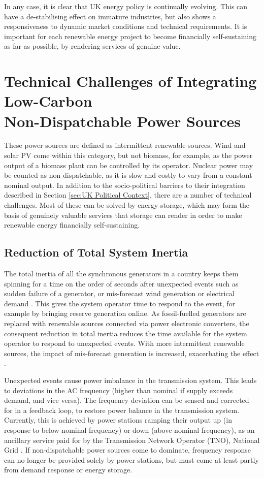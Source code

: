 \documentclass[report_18month.tex]{subfiles}
\begin{document}
In any case, it is clear that UK energy policy is continually evolving. This can have a de-stabilising effect on immature industries, but also shows a responsiveness to dynamic market conditions and technical requirements. It is important for each renewable energy project to become financially self-sustaining as far as possible, by rendering services of genuine value.

\section{Technical Challenges of Integrating Low-Carbon\\ Non-Dispatchable Power Sources}
\label{sec:Technical Challenges of Integrating Low-Carbon Non-Dispatchable Power Sources}
These power sources are defined as intermittent renewable sources. Wind and solar PV come within this category, but not biomass, for example, as the power output of a biomass plant can be controlled by its operator. Nuclear power may be counted as non-dispatchable, as it is slow and costly to vary from a constant nominal output. In addition to the socio-political barriers to their integration described in Section \ref{sec:UK Political Context}, there are a number of technical challenges. Most of these can be solved by energy storage, which may form the basis of genuinely valuable services that storage can render in order to make renewable energy financially self-sustaining.

\subsection{Reduction of Total System Inertia}
\label{sec:Reduction of Total System Inertia}
The total inertia of all the synchronous generators in a country keeps them spinning for a time on the order of seconds after unexpected events such as sudden failure of a generator, or mis-forecast wind generation or electrical demand \cite{kirby2004frequency}. This gives the system operator time to respond to the event, for example by bringing reserve generation online. As fossil-fuelled generators are replaced with renewable sources connected via power electronic converters, the consequent reduction in total inertia reduces the time available for the system operator to respond to unexpected events. With more intermittent renewable sources, the impact of mis-forecast generation is increased, exacerbating the effect \cite{klimstra2014power}.

Unexpected events cause power imbalance in the transmission system. This leads to deviations in the AC frequency (higher than nominal if supply exceeds demand, and vice versa). The frequency deviation can be sensed and corrected for in a feedback loop, to restore power balance in the transmission system. Currently, this is achieved by power stations ramping their output up (in response to below-nominal frequency) or down (above-nominal frequency), as an ancillary service paid for by the Transmission Network Operator (TNO), National Grid \cite{natgrid2013ffr}. If non-dispatchable power sources come to dominate, frequency response can no longer be provided solely by power stations, but must come at least partly from demand response or energy storage.
\end{document}
